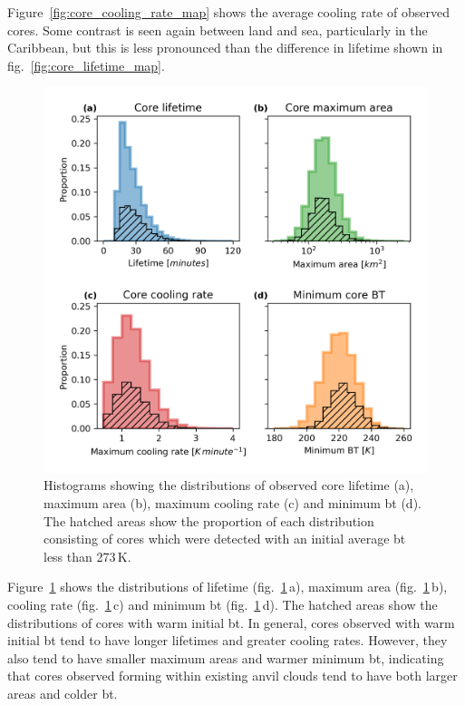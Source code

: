 Figure~\ref{fig:core_cooling_rate_map} shows the average cooling rate of observed cores.
Some contrast is seen again between land and sea, particularly in the Caribbean, but this is less pronounced than the difference in lifetime shown in fig.~\ref{fig:core_lifetime_map}.



\begin{figure}[tp]
    \centering
    \includegraphics[width=\textwidth]{figures/chapter2_08.png}
    \caption[
    Histograms showing the distributions of observed core properties
    ]{
    Histograms showing the distributions of observed core lifetime (a), maximum area (b), maximum cooling rate (c) and minimum \acrshort{bt} (d). The hatched areas show the proportion of each distribution consisting of cores which were detected with an initial average \acrshort{bt} less than 273\,\unit{K}.
    }
    \label{fig:core_properties}
\end{figure}

Figure~\ref{fig:core_properties} shows the distributions of lifetime (fig.~\ref{fig:core_properties}\,a), maximum area (fig.~\ref{fig:core_properties}\,b), cooling rate (fig.~\ref{fig:core_properties}\,c) and minimum \acrshort{bt} (fig.~\ref{fig:core_properties}\,d).
The hatched areas show the distributions of cores with warm initial \acrshort{bt}.
In general, cores observed with warm initial \acrshort{bt} tend to have longer lifetimes and greater cooling rates.
However, they also tend to have smaller maximum areas and warmer minimum \acrshort{bt}, indicating that cores observed forming within existing anvil clouds tend to have both larger areas and colder \acrshort{bt}.

